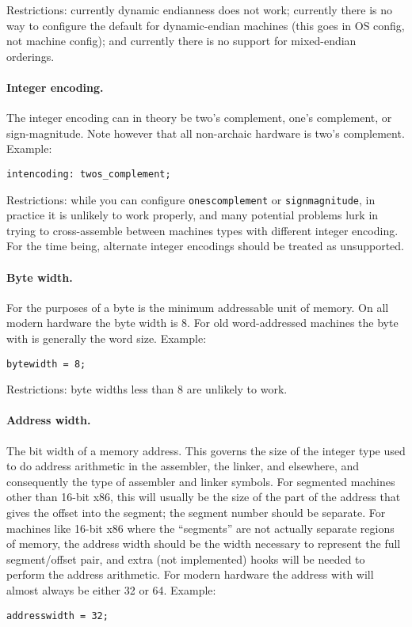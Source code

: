 Restrictions: currently dynamic endianness does not work; currently
there is no way to configure the default for dynamic-endian machines
(this goes in OS config, not machine config); and currently there is
no support for mixed-endian orderings.

\paragraph{Integer encoding.}
The integer encoding can in theory be two's complement, one's
complement, or sign-magnitude.
Note however that all non-archaic hardware is two's complement.
Example:
\begin{verbatim}
intencoding: twos_complement;
\end{verbatim}

Restrictions: while you can configure \texttt{ones{\us}complement} or
\texttt{sign{\us}magnitude}, in practice it is unlikely to work
properly, and many potential problems lurk in trying to cross-assemble
between machines types with different integer encoding.
For the time being, alternate integer encodings should be treated as
unsupported.

\paragraph{Byte width.}
For the purposes of {\bintools} a byte is the minimum addressable unit
of memory.
On all modern hardware the byte width is 8.
For old word-addressed machines the byte with is generally the word
size.
Example:
\begin{verbatim}
bytewidth = 8;
\end{verbatim}

Restrictions: byte widths less than 8 are unlikely to work.

\paragraph{Address width.}
The bit width of a memory address.
This governs the size of the integer type used to do address
arithmetic in the assembler, the linker, and elsewhere, and
consequently the type of assembler and linker symbols.
For segmented machines other than 16-bit x86, this will usually be the
size of the part of the address that gives the offset into the
segment; the segment number should be separate.
For machines like 16-bit x86 where the ``segments'' are not actually
separate regions of memory, the address width should be the width
necessary to represent the full segment/offset pair, and extra (not
implemented) hooks will be needed to perform the address arithmetic.
For modern hardware the address with will almost always be either 32
or 64.
Example:
\begin{verbatim}
addresswidth = 32;
\end{verbatim}

